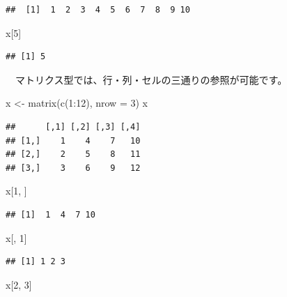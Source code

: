 \documentclass[
  12pt,
]{book}
\newenvironment{Shaded}{\begin{snugshade}}{\end{snugshade}}
\newcommand{\AttributeTok}[1]{\textcolor[rgb]{0.77,0.63,0.00}{#1}}
\newcommand{\DecValTok}[1]{\textcolor[rgb]{0.00,0.00,0.81}{#1}}
\newcommand{\FunctionTok}[1]{\textcolor[rgb]{0.00,0.00,0.00}{#1}}
\newcommand{\NormalTok}[1]{#1}
\newcommand{\OtherTok}[1]{\textcolor[rgb]{0.56,0.35,0.01}{#1}}
\newcommand{\SpecialCharTok}[1]{\textcolor[rgb]{0.00,0.00,0.00}{#1}}
\begin{document}
\begin{verbatim}
##  [1]  1  2  3  4  5  6  7  8  9 10
\end{verbatim}

\begin{Shaded}
\begin{Highlighting}[numbers=left,,]
\NormalTok{x[}\DecValTok{5}\NormalTok{]}
\end{Highlighting}
\end{Shaded}

\begin{verbatim}
## [1] 5
\end{verbatim}

　マトリクス型では、行・列・セルの三通りの参照が可能です。

\begin{Shaded}
\begin{Highlighting}[numbers=left,,]
\NormalTok{x }\OtherTok{\textless{}{-}} \FunctionTok{matrix}\NormalTok{(}\FunctionTok{c}\NormalTok{(}\DecValTok{1}\SpecialCharTok{:}\DecValTok{12}\NormalTok{), }\AttributeTok{nrow =} \DecValTok{3}\NormalTok{)}
\NormalTok{x}
\end{Highlighting}
\end{Shaded}

\begin{verbatim}
##      [,1] [,2] [,3] [,4]
## [1,]    1    4    7   10
## [2,]    2    5    8   11
## [3,]    3    6    9   12
\end{verbatim}

\begin{Shaded}
\begin{Highlighting}[numbers=left,,]
\NormalTok{x[}\DecValTok{1}\NormalTok{, ]}
\end{Highlighting}
\end{Shaded}

\begin{verbatim}
## [1]  1  4  7 10
\end{verbatim}

\begin{Shaded}
\begin{Highlighting}[numbers=left,,]
\NormalTok{x[, }\DecValTok{1}\NormalTok{]}
\end{Highlighting}
\end{Shaded}

\begin{verbatim}
## [1] 1 2 3
\end{verbatim}

\begin{Shaded}
\begin{Highlighting}[numbers=left,,]
\NormalTok{x[}\DecValTok{2}\NormalTok{, }\DecValTok{3}\NormalTok{]}
\end{Highlighting}
\end{Shaded}
\end{document}

